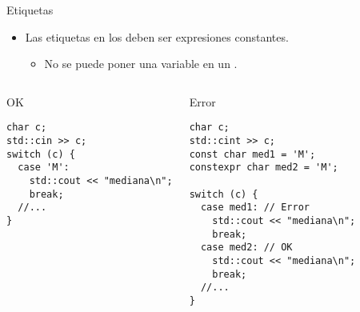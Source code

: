 \begin{frame}[t,fragile]{Etiquetas}
\begin{itemize}
  \item Las etiquetas en los  deben ser expresiones constantes.
    \begin{itemize}
      \item No se puede poner una variable en un .
    \end{itemize}
\end{itemize}

\begin{columns}[T]

\begin{block}{OK}
\begin{lstlisting}
char c;
std::cin >> c;
switch (c) {
  case 'M':
    std::cout << "mediana\n";
    break;
  //...
}
\end{lstlisting}
\end{block}

\begin{block}{Error}
\begin{lstlisting}
char c;
std::cint >> c;
const char med1 = 'M';
constexpr char med2 = 'M';

switch (c) {
  case med1: // Error
    std::cout << "mediana\n";
    break;
  case med2: // OK
    std::cout << "mediana\n";
    break;
  //...
}
\end{lstlisting}
\end{block}

\end{columns}
\end{frame}

